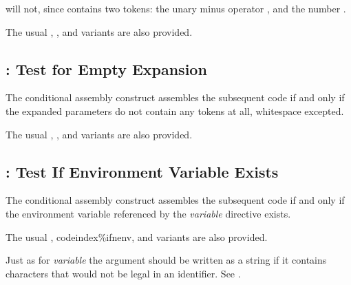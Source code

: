 will not, since  contains two tokens: the unary minus operator
\code{-}, and the number .

The usual , , and
 variants are also provided.

\subsection{: Test for Empty Expansion}
\label{subsec:ifempty}

The conditional assembly construct  assembles the
subsequent code if and only if the expanded parameters do not contain
any tokens at all, whitespace excepted.

The usual , , and
 variants are also provided.

\label{subsec:ifenv}
\subsection{: Test If Environment Variable Exists}

The conditional assembly construct  assembles the
subsequent code if and only if the environment variable referenced by
the \code{\%!}\emph{variable} directive exists.

The usual , codeindex{\%ifnenv}, and 
variants are also provided.

Just as for \code{\%!}\emph{variable} the argument should be written as a
string if it contains characters that would not be legal in an
identifier. See .
